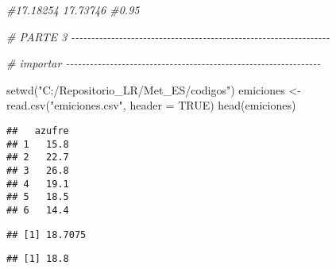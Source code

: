 \documentclass[
]{article}
\newenvironment{Shaded}{\begin{snugshade}}{\end{snugshade}}
\newcommand{\AttributeTok}[1]{\textcolor[rgb]{0.77,0.63,0.00}{#1}}
\newcommand{\CommentTok}[1]{\textcolor[rgb]{0.56,0.35,0.01}{\textit{#1}}}
\newcommand{\ConstantTok}[1]{\textcolor[rgb]{0.00,0.00,0.00}{#1}}
\newcommand{\DecValTok}[1]{\textcolor[rgb]{0.00,0.00,0.81}{#1}}
\newcommand{\FunctionTok}[1]{\textcolor[rgb]{0.00,0.00,0.00}{#1}}
\newcommand{\NormalTok}[1]{#1}
\newcommand{\OtherTok}[1]{\textcolor[rgb]{0.56,0.35,0.01}{#1}}
\newcommand{\SpecialCharTok}[1]{\textcolor[rgb]{0.00,0.00,0.00}{#1}}
\newcommand{\StringTok}[1]{\textcolor[rgb]{0.31,0.60,0.02}{#1}}
\begin{document}
\begin{Shaded}
\begin{Highlighting}[]
\CommentTok{\#17.18254 17.73746 \#0.95}


\CommentTok{\# PARTE 3 {-}{-}{-}{-}{-}{-}{-}{-}{-}{-}{-}{-}{-}{-}{-}{-}{-}{-}{-}{-}{-}{-}{-}{-}{-}{-}{-}{-}{-}{-}{-}{-}{-}{-}{-}{-}{-}{-}{-}{-}{-}{-}{-}{-}{-}{-}{-}{-}{-}{-}{-}{-}{-}{-}{-}{-}{-}{-}{-}{-}{-}{-}{-}{-}{-}}

\CommentTok{\# importar {-}{-}{-}{-}{-}{-}{-}{-}{-}{-}{-}{-}{-}{-}{-}{-}{-}{-}{-}{-}{-}{-}{-}{-}{-}{-}{-}{-}{-}{-}{-}{-}{-}{-}{-}{-}{-}{-}{-}{-}{-}{-}{-}{-}{-}{-}{-}{-}{-}{-}{-}{-}{-}{-}{-}{-}{-}{-}{-}{-}{-}{-}{-}{-}}

\FunctionTok{setwd}\NormalTok{(}\StringTok{"C:/Repositorio\_LR/Met\_ES/codigos"}\NormalTok{)}
\NormalTok{emiciones }\OtherTok{\textless{}{-}} \FunctionTok{read.csv}\NormalTok{(}\StringTok{"emiciones.csv"}\NormalTok{, }\AttributeTok{header =} \ConstantTok{TRUE}\NormalTok{) }
\FunctionTok{head}\NormalTok{(emiciones)}
\end{Highlighting}
\end{Shaded}

\begin{verbatim}
##   azufre
## 1   15.8
## 2   22.7
## 3   26.8
## 4   19.1
## 5   18.5
## 6   14.4
\end{verbatim}

\begin{Shaded}
\end{Shaded}

\begin{verbatim}
## [1] 18.7075
\end{verbatim}

\begin{Shaded}
\end{Shaded}

\begin{verbatim}
## [1] 18.8
\end{verbatim}

\begin{Shaded}
\end{Shaded}
\end{document}

